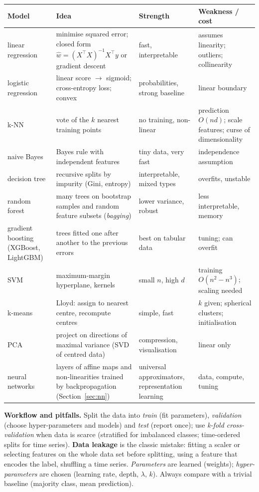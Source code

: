 \documentclass[10pt,a4paper,openany,oneside]{report}
\begin{document}
\begin{center}\small
\begin{xltabular}{\textwidth}{@{}L{2.9cm}L{4.3cm}L{3.6cm}Y@{}}
\toprule
\textbf{Model} & \textbf{Idea} & \textbf{Strength} & \textbf{Weakness / cost}\\
\midrule\endhead
linear regression & minimise squared error; closed form $\hat w=(X^\top X)^{-1}X^\top y$ or gradient descent & fast, interpretable & assumes linearity; outliers; collinearity\\
logistic regression & linear score $\to$ sigmoid; cross-entropy loss; convex & probabilities, strong baseline & linear boundary\\
k-NN & vote of the $k$ nearest training points & no training, non-linear & prediction $O(nd)$; scale features; curse of dimensionality\\
naive Bayes & Bayes rule with independent features & tiny data, very fast & independence assumption\\
decision tree & recursive splits by impurity (Gini, entropy) & interpretable, mixed types & overfits, unstable\\
random forest & many trees on bootstrap samples and random feature subsets (\emph{bagging}) & lower variance, robust & less interpretable, memory\\
gradient boosting (XGBoost, LightGBM) & trees fitted one after another to the previous errors & best on tabular data & tuning; can overfit\\
SVM & maximum-margin hyperplane, kernels & small $n$, high $d$ & training $O(n^2\!-\!n^3)$; scaling needed\\
k-means & Lloyd: assign to nearest centre, recompute centres & simple, fast & $k$ given; spherical clusters; initialisation\\
PCA & project on directions of maximal variance (SVD of centred data) & compression, visualisation & linear only\\
neural networks & layers of affine maps and non-linearities trained by backpropagation (Section~\ref{sec:nn}) & universal approximators, representation learning & data, compute, tuning\\
\bottomrule
\end{xltabular}
\end{center}
\textbf{Workflow and pitfalls.} Split the data into \emph{train} (fit parameters), \emph{validation} (choose hyper-parameters and models) and \emph{test} (report once); use \emph{k-fold cross-validation} when data is scarce (stratified for imbalanced classes; time-ordered splits for time series). \textbf{Data leakage} is the classic mistake: fitting a scaler or selecting features on the whole data set before splitting, using a feature that encodes the label, shuffling a time series. \emph{Parameters} are learned (weights); \emph{hyper-parameters} are chosen (learning rate, depth, $\lambda$, $k$). Always compare with a trivial baseline (majority class, mean prediction).
\end{document}
